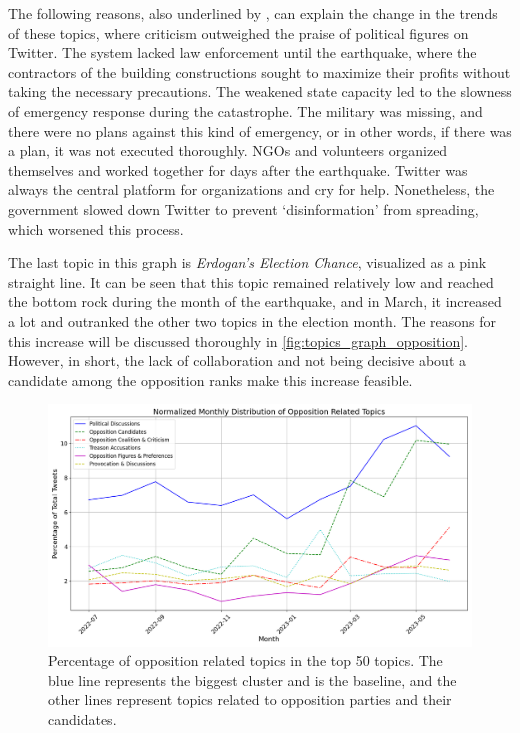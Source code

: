 The following reasons, also underlined by \textcite{cevik_aksoy_turkey_earthquake_2023}, can explain 
the change in the trends of these topics, where criticism outweighed the praise of political figures 
on Twitter. The system lacked law enforcement until the earthquake, where the 
contractors of the building constructions sought to maximize their profits without taking the 
necessary precautions. 
The weakened state capacity led to the slowness of emergency response during the catastrophe. 
The military was missing, and there were no plans against this kind of emergency, or in other words, 
if there was a plan, it was not executed thoroughly. 
NGOs and volunteers organized themselves and worked together for days after the earthquake. Twitter was always 
the central platform for organizations and cry for help. Nonetheless, the government slowed down 
Twitter to prevent `disinformation' from spreading, which worsened this process.

The last topic in this graph is \textit{Erdogan's Election Chance}, visualized as a pink straight line. 
It can be seen that this topic remained relatively low and reached the bottom rock during the month 
of the earthquake, and in March, it increased a lot and outranked the other two topics in the election 
month. The reasons for this increase will be discussed thoroughly in \autoref{fig:topics_graph_opposition}. 
However, in short, the lack of collaboration and not being decisive about a candidate among the 
opposition ranks make this increase feasible.

\begin{figure}[htb]
    \centering
    \includegraphics[width=\linewidth]{figures/normalized_opposition_selected_topics_distribution_with_styles.png}
    \caption[Normalized monthly distribution of opposition related topics]
    {Percentage of opposition related topics in the top 50 topics. 
    The blue line represents the biggest cluster and is the baseline, 
    and the other lines represent topics related to opposition parties and their candidates.}\label{fig:topics_graph_opposition}
\end{figure}

